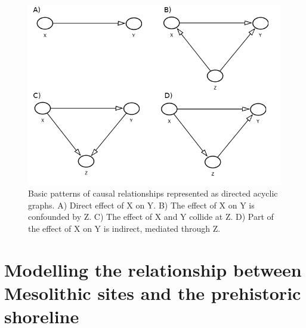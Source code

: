 \documentclass[
  12pt,
  a4paper,
  oneside]{book}
\begin{document}
\begin{figure}

{\centering \includegraphics[width=1\linewidth]{figures/dagittyexample} 

}

\caption{Basic patterns of causal relationships represented as directed acyclic graphs. A) Direct effect of X on Y. B) The effect of X on Y is confounded by Z. C) The effect of X and Y collide at Z. D) Part of the effect of X on Y is indirect, mediated through Z.}\label{fig:dag}
\end{figure}

\hypertarget{shoremodel}{%
\section{Modelling the relationship between Mesolithic sites and the prehistoric shoreline}\label{shoremodel}}

\end{document}
